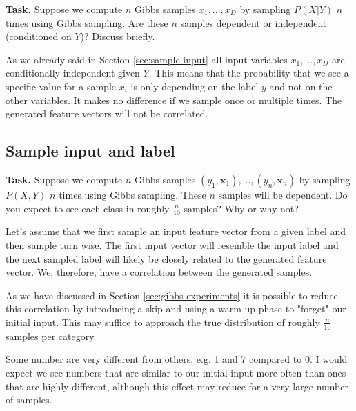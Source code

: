 \documentclass{support/acm_proc_article-sp}
\begin{document}
    \textbf{Task.} Suppose we compute $n$ Gibbs samples $x_1,...,x_D$ by sampling $P(X | Y)$ $n$ times using Gibbs sampling.
    Are these $n$ samples dependent or independent (conditioned on $Y$)?
    Discuss briefly.

    As we already said in Section \ref{sec:sample-input} all input variables $x_1,...,x_D$ are conditionally independent
    given $Y$.
    This means that the probability that we see a specific value for a sample $x_i$ is only depending on the label $y$ and
    not on the other variables.
    It makes no difference if we sample once or multiple times.
    The generated feature vectors will not be correlated.


    \subsection{Sample input and label}

    \textbf{Task.} Suppose we compute $n$ Gibbs samples $(y_1,\mathbf{x}_1),...,(y_n,\mathbf{x}_n)$ by sampling $P(X,Y)$ $n$ times using Gibbs sampling.
    These $n$ samples will be dependent.
    Do you expect to see each class in roughly $\frac{n}{10}$ samples?
    Why or why not?

    Let's assume that we first sample an input feature vector from a given label and then sample turn wise.
    The first input vector will resemble the input label and the next sampled label will likely be closely related
    to the generated feature vector.
    We, therefore, have a correlation between the generated samples.

    As we have discussed in Section \ref{sec:gibbs-experiments} it is possible to reduce this correlation by introducing a skip
    and using a warm-up phase to "forget" our initial input.
    This may suffice to approach the true distribution of roughly $\frac{n}{10}$ samples per category.

    Some number are very different from others, e.g. 1 and 7 compared to 0.
    I would expect we see numbers that are similar to our initial input more often than ones that are highly different,
    although this effect may reduce for a very large number of samples.

\end{document}
